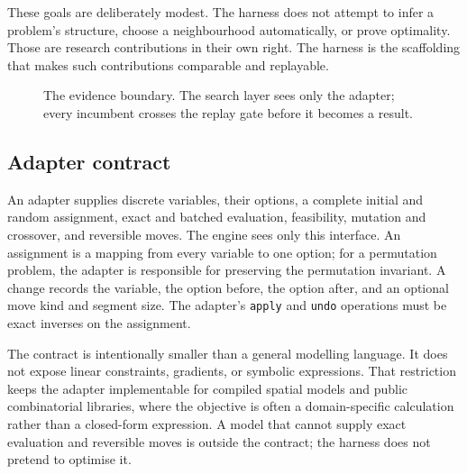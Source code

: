 \documentclass[pdflatex,sn-mathphys-num]{sn-jnl}
\begin{document}
These goals are deliberately modest. The harness does not attempt to infer a problem's structure,
choose a neighbourhood automatically, or prove optimality. Those are research contributions in their
own right. The harness is the scaffolding that makes such contributions comparable and replayable.

\begin{figure}[t]
\centering
{}
\caption{The evidence boundary. The search layer sees only the adapter; every incumbent crosses the replay gate before it becomes a result.}
\label{fig:architecture}
\end{figure}

\subsection{Adapter contract}

An adapter supplies discrete variables, their options, a complete initial and random assignment,
exact and batched evaluation, feasibility, mutation and crossover, and reversible moves. The engine
sees only this interface. An assignment is a mapping from every variable to one option; for a
permutation problem, the adapter is responsible for preserving the permutation invariant. A change
records the variable, the option before, the option after, and an optional move kind and segment size.
The adapter's \texttt{apply} and \texttt{undo} operations must be exact inverses on the assignment.

The contract is intentionally smaller than a general modelling language. It does not expose linear
constraints, gradients, or symbolic expressions. That restriction keeps the adapter implementable for
compiled spatial models and public combinatorial libraries, where the objective is often a
domain-specific calculation rather than a closed-form expression. A model that cannot supply exact
evaluation and reversible moves is outside the contract; the harness does not pretend to optimise it.
\end{document}
